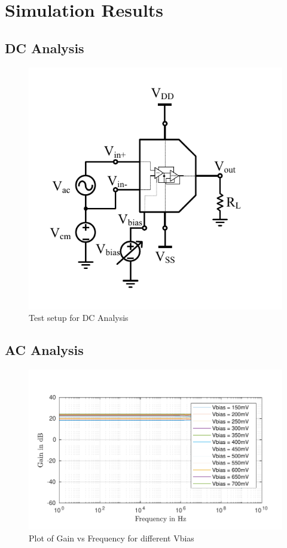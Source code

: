 \chapter{Simulation Results}
\section{DC Analysis}
\begin{figure} [H]
\centering
\includegraphics[scale=1]{Figures/Test_Benches/Overall/ACDC.pdf}
\caption{Test setup for DC Analysis}
\end{figure}



\section{AC Analysis}

\begin{figure} [H]
\centering
\includegraphics[scale=1]{Figures/Plots/Ov_Gain.pdf}
\caption{Plot of Gain vs Frequency for different Vbias}
\end{figure}

